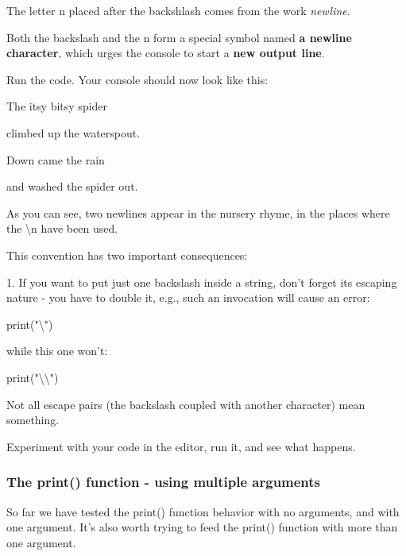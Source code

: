\documentclass[a4paper,10pt]{article}
\begin{document}
The letter {\selectfont n} placed after the backshlash comes from the work \textit{newline}.
\newline

Both the backslash and the {\selectfont n} form a special symbol named \textbf{a newline character}, which urges the console to start a \textbf{new output line}.
\newline

Run the code. Your console should now look like this:
\newline

{\selectfont The itsy bitsy spider

climbed up the waterspout.
\newline

Down came the rain

and washed the spider out.}


As you can see, two newlines appear in the nursery rhyme, in the places where the {\selectfont \textbackslash n} have been used.
\newline

This convention has two important consequences:
\newline

1. If you want to put just one backslash inside a string, don't forget its escaping nature - you have to double it, e.g., such an invocation will cause an error:
\newline

{\selectfont print("\textbackslash")}
\newline

while this one won't:
\newline

{\selectfont print("\textbackslash\textbackslash")}
\newline


Not all escape pairs (the backslash coupled with another character) mean something.
\newline

Experiment with your code in the editor, run it, and see what happens.
\newline

\subsubsection{The print() function - using multiple arguments}
So far we have tested the {\selectfont print()} function behavior with no arguments, and with one argument. It's also worth trying to feed the {\selectfont print()} function with more than one argument.
\newline
\end{document}

